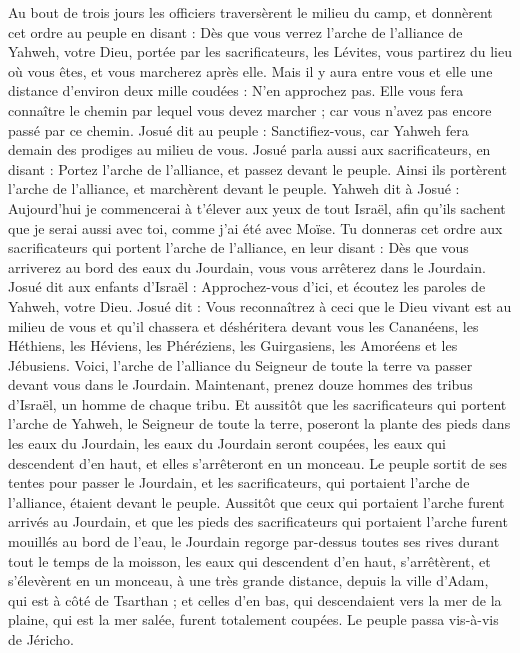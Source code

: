 \begin{multicols}{2}
Au bout de trois jours les officiers traversèrent le milieu du camp,
et donnèrent cet ordre au peuple en disant : Dès que vous verrez l’arche de l’alliance de Yahweh, votre Dieu, portée par les sacrificateurs, les Lévites, vous partirez du lieu où vous êtes, et vous marcherez après elle.
Mais il y aura entre vous et elle une distance d’environ deux mille coudées : N’en approchez pas. Elle vous fera connaître le chemin par lequel vous devez marcher ; car vous n’avez pas encore passé par ce chemin.
Josué dit au peuple : Sanctifiez-vous, car Yahweh fera demain des prodiges au milieu de vous.
Josué parla aussi aux sacrificateurs, en disant : Portez l’arche de l’alliance, et passez devant le peuple. Ainsi ils portèrent l’arche de l’alliance, et marchèrent devant le peuple.
Yahweh dit à Josué : Aujourd’hui je commencerai à t’élever aux yeux de tout Israël, afin qu’ils sachent que je serai aussi avec toi, comme j’ai été avec Moïse.
Tu donneras cet ordre aux sacrificateurs qui portent l’arche de l’alliance, en leur disant : Dès que vous arriverez au bord des eaux du Jourdain, vous vous arrêterez dans le Jourdain.
Josué dit aux enfants d’Israël : Approchez-vous d’ici, et écoutez les paroles de Yahweh, votre Dieu.
Josué dit : Vous reconnaîtrez à ceci que le Dieu vivant est au milieu de vous et qu’il chassera et déshéritera devant vous les Cananéens, les Héthiens, les Héviens, les Phéréziens, les Guirgasiens, les Amoréens et les Jébusiens.
Voici, l’arche de l’alliance du Seigneur de toute la terre va passer devant vous dans le Jourdain.
Maintenant, prenez douze hommes des tribus d’Israël, un homme de chaque tribu.
Et aussitôt que les sacrificateurs qui portent l’arche de Yahweh, le Seigneur de toute la terre, poseront la plante des pieds dans les eaux du Jourdain, les eaux du Jourdain seront coupées, les eaux qui descendent d’en haut, et elles s’arrêteront en un monceau.
Le peuple sortit de ses tentes pour passer le Jourdain, et les sacrificateurs, qui portaient l’arche de l’alliance, étaient devant le peuple.
Aussitôt que ceux qui portaient l’arche furent arrivés au Jourdain, et que les pieds des sacrificateurs qui portaient l’arche furent mouillés au bord de l’eau, le Jourdain regorge par-dessus toutes ses rives durant tout le temps de la moisson,
les eaux qui descendent d’en haut, s’arrêtèrent, et s’élevèrent en un monceau, à une très grande distance, depuis la ville d’Adam, qui est à côté de Tsarthan ; et celles d’en bas, qui descendaient vers la mer de la plaine, qui est la mer salée, furent totalement coupées. Le peuple passa vis-à-vis de Jéricho.

\end{multicols}
